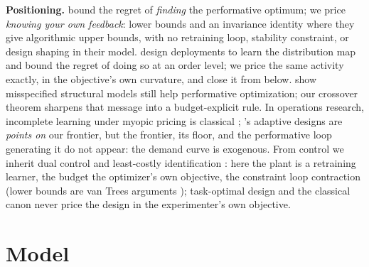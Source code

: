 \documentclass{article}
\begin{document}
\textbf{Positioning.} \citet{jagadeesan2022regret} bound the regret of \emph{finding} the performative optimum; we price \emph{knowing your own feedback}: lower bounds and an invariance identity where they give algorithmic upper bounds, with no retraining loop, stability constraint, or design shaping in their model. \citet{bracale2025reverse} design deployments to learn the distribution map and bound the regret of doing so at an order level; we price the same activity exactly, in the objective's own curvature, and close it from below. \citet{lin2024plugin} show misspecified structural models still help performative optimization; our crossover theorem sharpens that message into a budget-explicit rule. In operations research, incomplete learning under myopic pricing is classical \citep{rothschild1974two,harrison2012bayesian,keskin2014dynamic,broder2012dynamic,denboer2015dynamic}; \citet{lai1979adaptive}'s adaptive designs are \emph{points on} our frontier, but the frontier, its floor, and the performative loop generating it do not appear: the demand curve is exogenous. From control we inherit dual control \citep{feldbaum1960dual} and least-costly identification \citep{bombois2006least}: here the plant is a retraining learner, the budget the optimizer's own objective, the constraint loop contraction (lower bounds are van Trees arguments \citep{gill1995applications}); task-optimal design \citep{wagenmaker2021task,dean2020sample} and the classical canon \citep{kiefer1960equivalence,pukelsheim2006optimal} never price the design in the experimenter's own objective.

\section{Model}
\label{sec:model}
\end{document}
